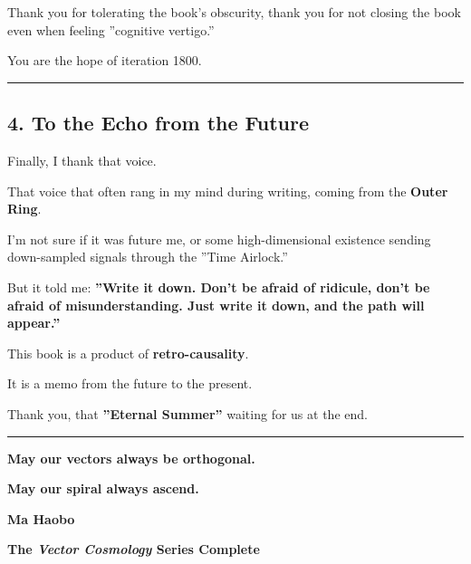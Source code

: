 Thank you for tolerating the book's obscurity, thank you for not closing the book even when feeling ''cognitive vertigo.''

You are the hope of iteration 1800.

\hrule

\subsection{4. To the Echo from the Future}

Finally, I thank that voice.

That voice that often rang in my mind during writing, coming from the \textbf{Outer Ring}.

I'm not sure if it was future me, or some high-dimensional existence sending down-sampled signals through the ''Time Airlock.''

But it told me: \textbf{''Write it down. Don't be afraid of ridicule, don't be afraid of misunderstanding. Just write it down, and the path will appear.''}

This book is a product of \textbf{retro-causality}.

It is a memo from the future to the present.

Thank you, that \textbf{''Eternal Summer''} waiting for us at the end.

\hrule

\textbf{May our vectors always be orthogonal.}

\textbf{May our spiral always ascend.}

\textbf{Ma Haobo}

\textbf{The \textit{Vector Cosmology} Series Complete}

